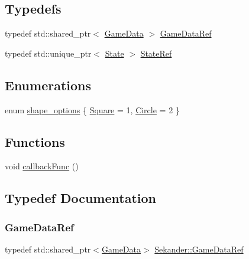 \subsection*{Typedefs}
\begin{DoxyCompactItemize}
\item 
typedef std\+::shared\+\_\+ptr$<$ \hyperlink{structSekander_1_1GameData}{Game\+Data} $>$ \hyperlink{namespaceSekander_a1d69b002ba2d23020901c28f0def5e16}{Game\+Data\+Ref}
\item 
typedef std\+::unique\+\_\+ptr$<$ \hyperlink{classSekander_1_1State}{State} $>$ \hyperlink{namespaceSekander_a8503cedf9c863e9f6986eb29f2296f1a}{State\+Ref}
\end{DoxyCompactItemize}
\subsection*{Enumerations}
\begin{DoxyCompactItemize}
\item 
enum \hyperlink{namespaceSekander_aed8eb219f4685b29738464e9f32c5d94}{shape\+\_\+options} \{ \hyperlink{namespaceSekander_aed8eb219f4685b29738464e9f32c5d94ae1827bea553b36ce0bbc7cddd6c57621}{Square} = 1, 
\hyperlink{namespaceSekander_aed8eb219f4685b29738464e9f32c5d94acafcba9574f3415e8e9f6f194a6cb869}{Circle} = 2
 \}
\end{DoxyCompactItemize}
\subsection*{Functions}
\begin{DoxyCompactItemize}
\item 
void \hyperlink{namespaceSekander_a9abc849b0e833c5c6f3a8b33bdd3f763}{callback\+Func} ()
\end{DoxyCompactItemize}


\subsection{Typedef Documentation}
\mbox{\label{namespaceSekander_a1d69b002ba2d23020901c28f0def5e16}} 
\subsubsection{\texorpdfstring{Game\+Data\+Ref}{GameDataRef}}
{\footnotesize\ttfamily typedef std\+::shared\+\_\+ptr$<$\hyperlink{structSekander_1_1GameData}{Game\+Data}$>$ \hyperlink{namespaceSekander_a1d69b002ba2d23020901c28f0def5e16}{Sekander\+::\+Game\+Data\+Ref}}

